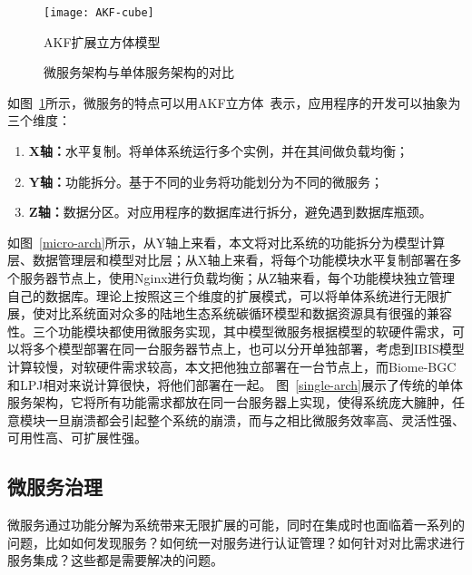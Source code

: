 \begin{figure}[!htbp]
    \centering
    \texttt{[image: AKF-cube]}
    \caption{AKF扩展立方体模型}
    \label{fig:AKF-cube}
\end{figure}

\begin{figure}[!htbp]
    \centering
    \hfill
    \caption{微服务架构与单体服务架构的对比}
    \label{fig:ms-server-microservice}
\end{figure}

如图~\ref{fig:AKF-cube}所示，微服务的特点可以用AKF立方体~\cite{abbott2009art}表示，应用程序的开发可以抽象为三个维度：

\begin{enumerate}[(1)]
    \item \textbf{X轴：}水平复制。将单体系统运行多个实例，并在其间做负载均衡；
    \item \textbf{Y轴：}功能拆分。基于不同的业务将功能划分为不同的微服务；
    \item \textbf{Z轴：}数据分区。对应用程序的数据库进行拆分，避免遇到数据库瓶颈。
\end{enumerate}

如图~\ref{micro-arch}所示，从Y轴上来看，本文将对比系统的功能拆分为模型计算层、数据管理层和模型对比层；从X轴上来看，将每个功能模块水平复制部署在多个服务器节点上，使用Nginx进行负载均衡；从Z轴来看，每个功能模块独立管理自己的数据库。理论上按照这三个维度的扩展模式，可以将单体系统进行无限扩展，使对比系统面对众多的陆地生态系统碳循环模型和数据资源具有很强的兼容性。三个功能模块都使用微服务实现，其中模型微服务根据模型的软硬件需求，可以将多个模型部署在同一台服务器节点上，也可以分开单独部署，考虑到IBIS模型计算较慢，对软硬件需求较高，本文把他独立部署在一台节点上，而Biome-BGC和LPJ相对来说计算很快，将他们部署在一起。
图~\ref{single-arch}展示了传统的单体服务架构，它将所有功能需求都放在同一台服务器上实现，使得系统庞大臃肿，任意模块一旦崩溃都会引起整个系统的崩溃，而与之相比微服务效率高、灵活性强、可用性高、可扩展性强。

\subsection{微服务治理}
微服务通过功能分解为系统带来无限扩展的可能，同时在集成时也面临着一系列的问题，比如如何发现服务？如何统一对服务进行认证管理？如何针对对比需求进行服务集成？这些都是需要解决的问题。
